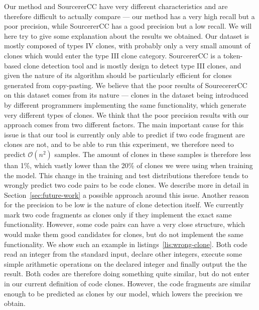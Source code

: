 Our method and SourcererCC have very different characteristics and are therefore
difficult to actually compare --- our method has a very high recall but a poor
precision, while SourcererCC has a good precision but a low recall. We will
here try to give some explanation about the results we obtained. Our dataset is
mostly composed of types IV clones, with probably only a very small amount of
clones which would enter the type III clone category. SourcererCC is a
token-based clone detection tool and is mostly design to detect type III clones,
and given the nature of its algorithm should be particularly efficient for
clones generated from copy-pasting. We believe that the poor results of
SourecererCC on this dataset comes from its nature --- clones in the dataset
being introduced by different programmers implementing the same functionality,
which generate very different types of clones. We think that the poor precision
results with our approach comes from two different factors. The main important
cause for this issue is that our tool is currently only able to predict if two
code fragment are clones are not, and to be able to run this experiment, we
therefore need to predict $\mathcal{O}\left( n^2 \right)$ samples. The amount of
clones in these samples is therefore less than 1\%, which vastly lower than the
20\% of clones we were using when training the model. This change in the
training and test distributions therefore tends to wrongly predict two code
pairs to be code clones. We describe more in detail in
Section~\ref{sec:future-work} a possible approach around this issue. Another
reason for the precision to be low is the nature of clone detection itself. We
currently mark two code fragments as clones only if they implement the exact
same functionality. However, some code pairs can have a very close structure,
which would make them good candidates for clones, but do not implement the same
functionality. We show such an example in listings~\ref{lis:wrong-clone}. Both
code read an integer from the standard input, declare other integers, execute
some simple arithmetic operations on the declared integer and finally output the
the result. Both codes are therefore doing something quite similar, but do not
enter in our current definition of code clones. However, the code fragments are
similar enough to be predicted as clones by our model, which lowers the
precision we obtain.
\begin{figure}
  
  
\end{figure}

